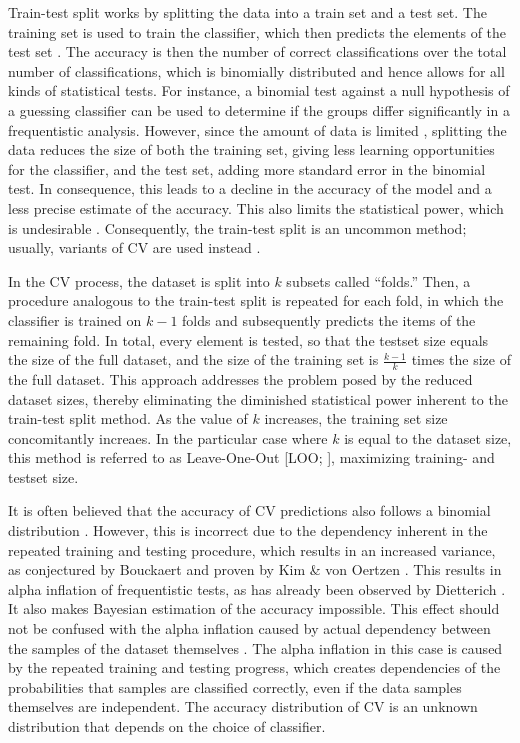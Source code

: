 \documentclass[man]{apa7}
\begin{document}
Train-test split works by splitting the data into a train set and a test set.
The training set is used to train the classifier, which then predicts the elements of the test set \citep{kohavi_study_1995}.
The accuracy is then the number of correct classifications over the total number of classifications, which is binomially distributed and hence allows for all kinds of statistical tests. For instance, a binomial test against a null hypothesis of a guessing classifier can be used to determine if the groups differ significantly in a frequentistic analysis.
However, since the amount of data is limited \citep{sahiner_classifier_2008}, splitting the data reduces the size of both the training set, giving less learning opportunities for the classifier, and the test set, adding more standard error in the binomial test.
In consequence, this leads to a decline in the accuracy of the model \citep{santafe_dealing_2015} and a less precise estimate of the accuracy. This also limits the statistical power, which is undesirable \citep{rossi_statistical_2013}.
Consequently, the train-test split is an uncommon method; usually, variants of CV are used instead \citep{kohavi_study_1995, devroye_distribution-free_1979, geisser_predictive_1975, stone_cross-validatory_1974}.

In the CV process, the dataset is split into $k$ subsets called ``folds.'' Then, a procedure analogous to the train-test split is repeated for each fold, in which the classifier is trained on $k-1$ folds and subsequently predicts the items of the remaining fold. In total, every element is tested, so that the testset size equals the size of the full dataset, and the size of the training set is $\frac{k-1}{k}$ times the size of the full dataset. This approach addresses the problem posed by the reduced dataset sizes, thereby eliminating the diminished statistical power inherent to the train-test split method. As the value of $k$ increases, the training set size concomitantly increaes. In the particular case where $k$ is equal to the dataset size, this method is referred to as Leave-One-Out [LOO; \citep{hastie2009elements}], maximizing training- and testset size.

It is often believed that the accuracy of CV predictions also follows a binomial distribution \citep{salzberg_comparing_1997}.
However, this is incorrect due to the dependency inherent in the repeated training and testing procedure, which results in an increased variance, as conjectured by Bouckaert \citep{bouckaert_choosing_2003} and proven by Kim \& von Oertzen \citep{independent_validation}.
This results in alpha inflation of frequentistic tests, as has already been observed by Dietterich \citep{dietterich_approximate_1998}. It also makes Bayesian estimation of the accuracy impossible. This effect should not be confused with the alpha inflation caused by actual dependency between the samples of the dataset themselves \citep{kohavi_study_1995}. The alpha inflation in this case is caused by the repeated training and testing progress, which creates dependencies of the probabilities that samples are classified correctly, even if the data samples themselves are independent.
The accuracy distribution of CV is an unknown distribution that depends on the choice of classifier.
\end{document}
